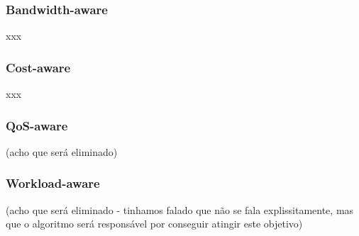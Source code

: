 
\subsubsection{Bandwidth-aware}
xxx

\subsubsection{Cost-aware}
xxx

\subsubsection{QoS-aware}
(acho que será eliminado)

\subsubsection{Workload-aware}
(acho que será eliminado - tinhamos falado que não se fala explissitamente, mas que o algoritmo será responsável por conseguir atingir este objetivo)

